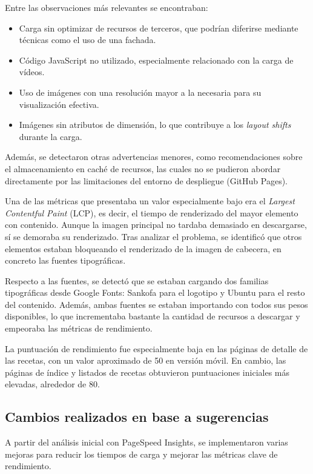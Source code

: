 \documentclass{article}
\begin{document}
Entre las observaciones más relevantes se encontraban:

\begin{itemize}
    \item Carga sin optimizar de recursos de terceros, que podrían diferirse mediante técnicas como el uso de una fachada.
    \item Código JavaScript no utilizado, especialmente relacionado con la carga de vídeos.
    \item Uso de imágenes con una resolución mayor a la necesaria para su visualización efectiva.
    \item Imágenes sin atributos de dimensión, lo que contribuye a los \textit{layout shifts} durante la carga.
\end{itemize}

Además, se detectaron otras advertencias menores, como recomendaciones sobre el almacenamiento en caché de recursos, las cuales no se pudieron abordar directamente por las limitaciones del entorno de despliegue (GitHub Pages).

Una de las métricas que presentaba un valor especialmente bajo era el \textit{Largest Contentful Paint} (LCP), es decir, el tiempo de renderizado del mayor elemento con contenido. Aunque la imagen principal no tardaba demasiado en descargarse, sí se demoraba su renderizado. Tras analizar el problema, se identificó que otros elementos estaban bloqueando el renderizado de la imagen de cabecera, en concreto las fuentes tipográficas.

Respecto a las fuentes, se detectó que se estaban cargando dos familias tipográficas desde Google Fonts: Sankofa para el logotipo y Ubuntu para el resto del contenido. Además, ambas fuentes se estaban importando con todos sus pesos disponibles, lo que incrementaba bastante la cantidad de recursos a descargar y empeoraba las métricas de rendimiento.

La puntuación de rendimiento fue especialmente baja en las páginas de detalle de las recetas, con un valor aproximado de 50 en versión móvil. En cambio, las páginas de índice y listados de recetas obtuvieron puntuaciones iniciales más elevadas, alrededor de 80.

\subsection{Cambios realizados en base a sugerencias}\label{subsec:cambios-realizados}

A partir del análisis inicial con PageSpeed Insights, se implementaron varias mejoras para reducir los tiempos de carga y mejorar las métricas clave de rendimiento.
\end{document}
